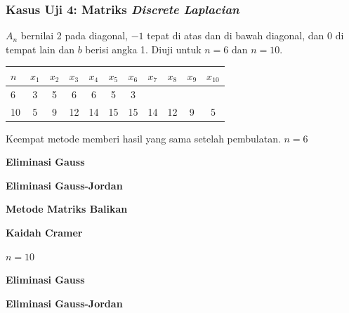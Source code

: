 \subsubsection{Kasus Uji 4: Matriks \textit{Discrete Laplacian}}
\begin{kasus}
$A_n$ bernilai 2 pada diagonal, $-1$ tepat di atas dan di bawah diagonal, dan 0 di tempat lain dan $b$ berisi angka 1. Diuji untuk $n = 6$ dan $n = 10$.
\begin{center}
\begin{tabular}{lcccccccccc}
\toprule
$n$ & $x_1$ & $x_2$ & $x_3$ & $x_4$ & $x_5$ & $x_6$ & $x_7$ & $x_8$ & $x_9$ & $x_{10}$ \\
\midrule
6  & 3 & 5 & 6 & 6 & 5 & 3 & & & & \\
10 & 5 & 9 & 12 & 14 & 15 & 15 & 14 & 12 & 9 & 5 \\
\bottomrule
\end{tabular}
\end{center}
Keempat metode memberi hasil yang sama setelah pembulatan.
\textbf{\boldmath$n = 6$}

\textbf{Eliminasi Gauss}

\textbf{Eliminasi Gauss-Jordan}

\textbf{Metode Matriks Balikan}

\textbf{Kaidah Cramer}

\textbf{\boldmath$n = 10$}

\textbf{Eliminasi Gauss}

\textbf{Eliminasi Gauss-Jordan}


\end{kasus}
